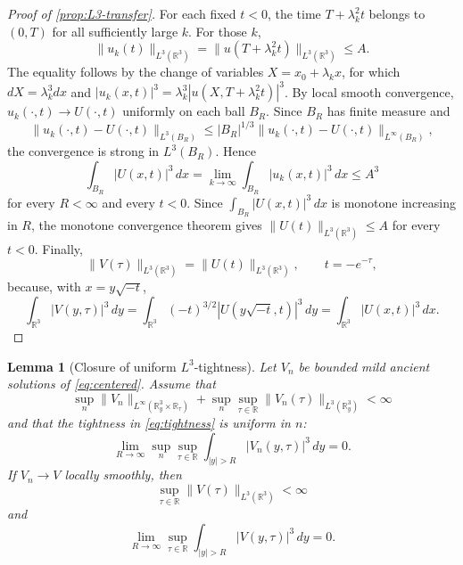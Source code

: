 \documentclass[11pt]{amsart}
\theoremstyle{plain}
\newtheorem{lemma}[theorem]{Lemma}
\theoremstyle{definition}
\theoremstyle{remark}
\numberwithin{equation}{section}
\begin{document}
\begin{proof}[Proof of \cref{prop:L3-transfer}]
For each fixed \(t<0\), the time \(T+\lambda_k^2t\) belongs to \((0,T)\) for
all sufficiently large \(k\).  For those \(k\),
\[
   \|u_k(t)\|_{L^3(\mathbb R^3)}
   =
   \|u(T+\lambda_k^2t)\|_{L^3(\mathbb R^3)}
   \le A.
\]
The equality follows by the change of variables
\(X=x_0+\lambda_kx\), for which \(dX=\lambda_k^3dx\) and
\(|u_k(x,t)|^3=\lambda_k^3|u(X,T+\lambda_k^2t)|^3\).  By local smooth
convergence, \(u_k(\cdot,t)\to U(\cdot,t)\) uniformly on each ball \(B_R\).
Since \(B_R\) has finite measure and
\[
   \|u_k(\cdot,t)-U(\cdot,t)\|_{L^3(B_R)}
   \le |B_R|^{1/3}
      \|u_k(\cdot,t)-U(\cdot,t)\|_{L^\infty(B_R)},
\]
the convergence is strong in \(L^3(B_R)\).  Hence
\[
   \int_{B_R}|U(x,t)|^3\,dx
   =
   \lim_{k\to\infty}\int_{B_R}|u_k(x,t)|^3\,dx
   \le A^3
\]
for every \(R<\infty\) and every \(t<0\).  Since
\(\int_{B_R}|U(x,t)|^3\,dx\) is monotone increasing in \(R\), the monotone
convergence theorem gives
\(\|U(t)\|_{L^3(\mathbb R^3)}\le A\) for every \(t<0\).
Finally,
\[
   \|V(\tau)\|_{L^3(\mathbb R^3)}
   =
   \|U(t)\|_{L^3(\mathbb R^3)},
   \qquad t=-e^{-\tau},
\]
because, with \(x=y\sqrt{-t}\),
\[
   \int_{\mathbb R^3}|V(y,\tau)|^3\,dy
   =
   \int_{\mathbb R^3}(-t)^{3/2}|U(y\sqrt{-t},t)|^3\,dy
   =
   \int_{\mathbb R^3}|U(x,t)|^3\,dx .
\]
\end{proof}

\begin{lemma}[Closure of uniform \(L^3\)-tightness]\label{lem:tight-closure}
Let \(V_n\) be bounded mild ancient solutions of \eqref{eq:centered}.  Assume
that
\[
   \sup_n\|V_n\|_{L^\infty(\mathbb R^3_y\times\mathbb R_\tau)}
   +\sup_n\sup_{\tau\in\mathbb R}\|V_n(\tau)\|_{L^3(\mathbb R^3_y)}
   <\infty
\]
and that the tightness in \eqref{eq:tightness} is uniform in \(n\):
\[
   \lim_{R\to\infty}
   \sup_n\sup_{\tau\in\mathbb R}\int_{|y|>R}|V_n(y,\tau)|^3\,dy=0.
\]
If \(V_n\to V\) locally smoothly, then
\[
   \sup_{\tau\in\mathbb R}\|V(\tau)\|_{L^3(\mathbb R^3)}<\infty
\]
and
\[
   \lim_{R\to\infty}
   \sup_{\tau\in\mathbb R}\int_{|y|>R}|V(y,\tau)|^3\,dy=0.
\]
\end{lemma}
\end{document}
